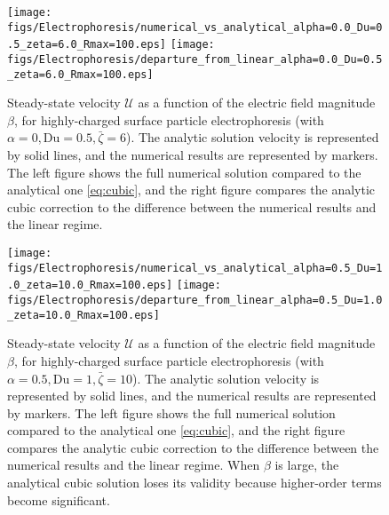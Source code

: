\documentclass[preprint,10pt]{elsarticle}
\newcommand\cU{\mathscr{U}}
\begin{document}
\begin{figure}
    \begin{center}
    \texttt{[image: figs/Electrophoresis/numerical\_vs\_analytical\_alpha=0.0\_Du=0.5\_zeta=6.0\_Rmax=100.eps]}
    \texttt{[image: figs/Electrophoresis/departure\_from\_linear\_alpha=0.0\_Du=0.5\_zeta=6.0\_Rmax=100.eps]}
        \caption[Highly-charged surface particle steady-state velocity]{
        Steady-state velocity $\cU$ as a function of the 
        electric field magnitude $\beta$, for highly-charged surface particle
        electrophoresis (with $\alpha = 0, \text{Du} = 0.5, \bar\zeta = 6$).
        The analytic solution velocity is represented by solid lines, 
        and the numerical results are represented by markers.
        The left figure shows the full numerical solution 
        compared to the analytical one \eqref{eq:cubic}, and
        the right figure compares the analytic cubic correction \cite{schnitzer2012cubic} 
        to the difference between the numerical results and the linear regime.}
	    \label{fig:Electrophoresis1}
    \end{center}
\end{figure}

\begin{figure}
    \begin{center}
    \texttt{[image: figs/Electrophoresis/numerical\_vs\_analytical\_alpha=0.5\_Du=1.0\_zeta=10.0\_Rmax=100.eps]}
    \texttt{[image: figs/Electrophoresis/departure\_from\_linear\_alpha=0.5\_Du=1.0\_zeta=10.0\_Rmax=100.eps]}
        \caption[Highly-charged surface particle steady-state velocity]{
        Steady-state velocity $\cU$ as a function of the 
        electric field magnitude $\beta$, for highly-charged surface particle
        electrophoresis (with $\alpha = 0.5, \text{Du} = 1, \bar\zeta = 10$).
        The analytic solution velocity is represented by solid lines, 
        and the numerical results are represented by markers.
        The left figure shows the full numerical solution 
        compared to the analytical one \eqref{eq:cubic}, and
        the right figure compares the analytic cubic correction \cite{schnitzer2012cubic} 
        to the difference between the numerical results and the linear regime.
        When $\beta$ is large, the analytical cubic solution loses its validity 
        because higher-order terms become significant.}
	    \label{fig:Electrophoresis2}
    \end{center}
\end{figure}
\end{document}
